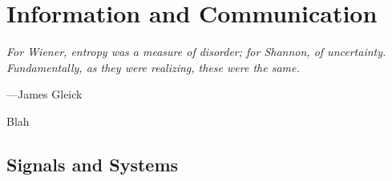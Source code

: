 

\toclineskip
\section{Information and Communication}

\vspace{4mm}
\begin{displayquote}
	\textit{For Wiener, entropy was a measure of disorder; for Shannon, of uncertainty. Fundamentally, as they were realizing, these were the same.}
	\vspace{2mm}
	\begin{flushright}
		---James Gleick
	\end{flushright}
\end{displayquote}
\vspace{4mm}



Blah


\subsection{Signals and Systems}

